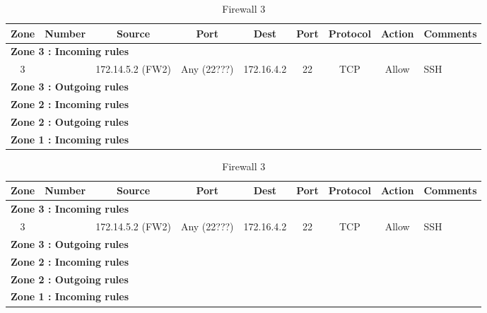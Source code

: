 \documentclass[a4paper,titlepage]{article}
\begin{document}

\begin{table}[h]
	\center
	\begin{tabular}{c|c|cc|cc|ccl}
		Zone & Number & Source & Port & Dest & Port & Protocol & Action & \multicolumn{1}{c}{Comments}\\
		\hline
		\multicolumn{9}{l}{\textbf{Zone 3 : Incoming rules}}\\
		3 &  & 172.14.5.2 (FW2) & Any (22???) & 172.16.4.2 & 22 & TCP & Allow & SSH\\

		\hline
		\multicolumn{9}{l}{\textbf{Zone 3 : Outgoing rules}}\\

		\hline
		\multicolumn{9}{l}{\textbf{Zone 2 : Incoming rules}}\\

		\hline
		\multicolumn{9}{l}{\textbf{Zone 2 : Outgoing rules}}\\

		\hline
		\multicolumn{9}{l}{\textbf{Zone 1 : Incoming rules}}\\


	\end{tabular}
	\caption{Firewall 3}
\end{table}



\begin{table}[h]
	\center
	\begin{tabular}{c|c|cc|cc|ccl}
		Zone & Number & Source & Port & Dest & Port & Protocol & Action & \multicolumn{1}{c}{Comments}\\
		\hline
		\multicolumn{9}{l}{\textbf{Zone 3 : Incoming rules}}\\
		3 &  & 172.14.5.2 (FW2) & Any (22???) & 172.16.4.2 & 22 & TCP & Allow & SSH\\

		\hline
		\multicolumn{9}{l}{\textbf{Zone 3 : Outgoing rules}}\\

		\hline
		\multicolumn{9}{l}{\textbf{Zone 2 : Incoming rules}}\\

		\hline
		\multicolumn{9}{l}{\textbf{Zone 2 : Outgoing rules}}\\

		\hline
		\multicolumn{9}{l}{\textbf{Zone 1 : Incoming rules}}\\


	\end{tabular}
	\caption{Firewall 3}
\end{table}
\end{document}
